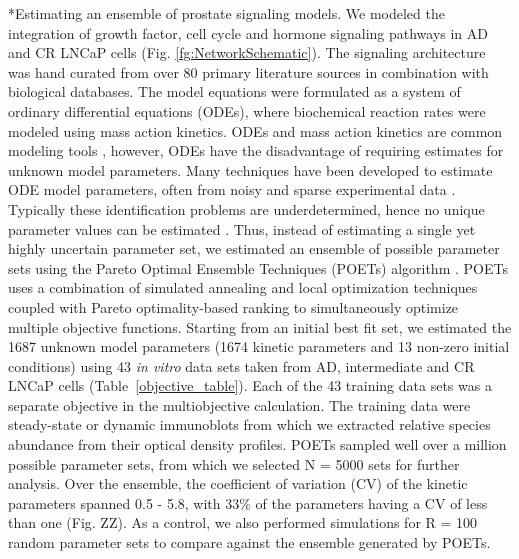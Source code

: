\documentclass[12pt]{article}
\makeatletter
\renewcommand\subsection{\@startsection
	{subsection}{2}{0mm}
	{-0.05in}
	{-0.5\baselineskip}
	{\normalfont\normalsize\bfseries}}
\makeatother
\begin{document}
\subsection*{Estimating an ensemble of prostate signaling models.} 
We modeled the integration of growth factor, cell cycle and hormone signaling pathways in AD and CR LNCaP cells (Fig. \ref{fg:NetworkSchematic}). 
The signaling architecture was hand curated from over 80 primary literature sources in combination with biological databases.
The model equations were formulated as a system of ordinary differential equations (ODEs), where biochemical reaction rates were modeled using mass action kinetics.
ODEs and mass action kinetics are common modeling tools \citep{Wayman2013}, however, ODEs have the disadvantage of requiring estimates for unknown model parameters.
Many techniques have been developed to estimate ODE model parameters, often from noisy and sparse experimental data \citep{Moles:2003dn}.
Typically these identification problems are underdetermined, hence no unique parameter values can be estimated \citep{Villaverde:2014kl}.
Thus, instead of estimating a single yet highly uncertain parameter set, we estimated an ensemble of possible parameter sets using the Pareto Optimal Ensemble Techniques (POETs) algorithm \citep{Song2010}.
POETs uses a combination of simulated annealing and local optimization techniques coupled with Pareto optimality-based ranking to simultaneously optimize multiple objective functions.
Starting from an initial best fit set, we estimated the 1687 unknown model parameters (1674 kinetic parameters and 13 non-zero initial conditions) using 43 \textit{in vitro} data sets taken from AD, intermediate and CR LNCaP cells (Table~\ref{objective_table}). 
Each of the 43 training data sets was a separate objective in the multiobjective calculation. 
The training data were steady-state or dynamic immunoblots from which we extracted relative species abundance from their optical density profiles. 
POETs sampled well over a million possible parameter sets, from which we selected N = 5000 sets for further analysis. 
Over the ensemble, the coefficient of variation (CV) of the kinetic parameters spanned 0.5 - 5.8, with 33\% of the parameters having a CV of less than one (Fig. ZZ). 
As a control, we also performed simulations for R = 100 random parameter sets to compare against the ensemble generated by POETs. 
\end{document}

